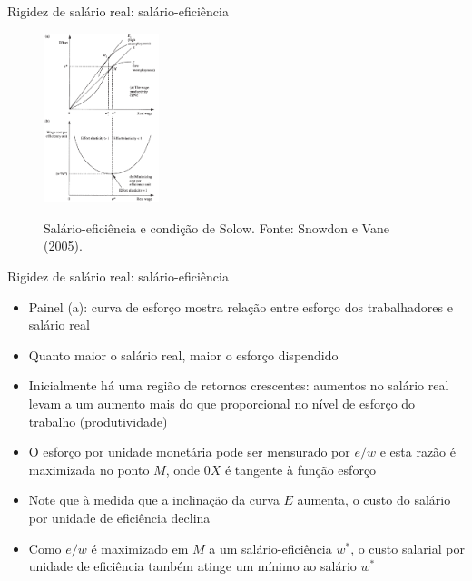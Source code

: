 \documentclass[10pt]{beamer}
\begin{document}
\begin{frame}{Rigidez de salário real: salário-eficiência}
    \begin{figure}
        \centering
        \href{https://raw.githubusercontent.com/pvfonseca/pec/main/notas/figures/aula15_fig6.PNG}{\includegraphics[width=0.3\textwidth]{./figures/aula15_fig6.PNG}}
        \caption{Salário-eficiência e condição de Solow. Fonte: Snowdon e Vane (2005).}
        \label{aula15_fig6}
    \end{figure}
\end{frame}

\begin{frame}{Rigidez de salário real: salário-eficiência}
    \begin{itemize}
        \item Painel (a): curva de esforço mostra relação entre esforço dos trabalhadores e salário real\bigskip
        \item Quanto maior o salário real, maior o esforço dispendido\bigskip
        \item Inicialmente há uma região de retornos crescentes: aumentos no salário real levam a um aumento mais do que proporcional no nível de esforço do trabalho (produtividade)\bigskip
        \item O esforço por unidade monetária pode ser mensurado por $e/w$ e esta razão é maximizada no ponto $M$, onde $0X$ é tangente à função esforço\bigskip
        \item Note que à medida que a inclinação da curva $E$ aumenta, o custo do salário por unidade de eficiência declina\bigskip
        \item Como $e/w$ é maximizado em $M$ a um salário-eficiência $w^*$, o custo salarial por unidade de eficiência também atinge um mínimo ao salário $w^*$
    \end{itemize}
\end{frame}
\end{document}
